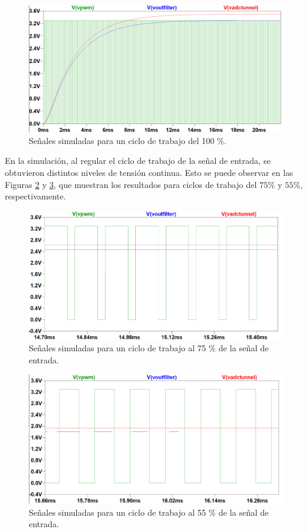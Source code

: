 \begin{figure}[H]
    \centering
    \includegraphics[width=1\linewidth]{Figuras/datalogger/Hardware/pwm100Percent.png}
    \caption{Señales simuladas para un ciclo de trabajo del 100 \%.}
    \label{fig:pwm100Percent}
\end{figure}
En la simulación, al regular el ciclo de trabajo de la señal de entrada, se obtuvieron distintos niveles de tensión continua. Esto se puede observar en las Figuras \ref{fig:pwm75Percent} y \ref{fig:pwm55Percent}, que muestran los resultados para ciclos de trabajo del $75\%$ y $55\%$, respectivamente.

\begin{figure}[H]
    \centering
    \includegraphics[width=1\linewidth]{Figuras/datalogger/Hardware/pwm75Percent.png}
    \caption{Señales simuladas para un ciclo de trabajo al 75 \% de la señal de entrada.}
    \label{fig:pwm75Percent}
\end{figure}



\begin{figure}[H]
    \centering
    \includegraphics[width=1\linewidth]{Figuras/datalogger/Hardware/pwm55Percent.png}
    \caption{Señales simuladas para un ciclo de trabajo al 55 \% de la señal de entrada.}
    \label{fig:pwm55Percent}
\end{figure}


